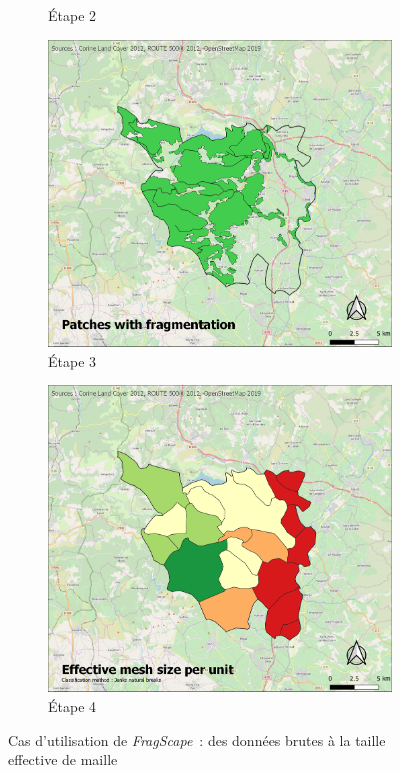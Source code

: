 \documentclass[11pt]{article}
\newcommand{\tool}{\emph{FragScape}}
\begin{document}
\begin{figure}[h!]
\begin{subfigure}[b]{.48\textwidth}
      \caption{Étape 2}
   \end{subfigure}
   \begin{subfigure}[b]{.48\textwidth}
      \includegraphics[width=\textwidth]{pictures/fragmPatches.png}
      \caption{Étape 3}
   \end{subfigure}
   \begin{subfigure}[b]{.48\textwidth}
      \includegraphics[width=\textwidth]{pictures/results.png}
      \caption{Étape 4}
   \end{subfigure}
   \caption{Cas d'utilisation de \tool\ : des données brutes à la taille effective de maille}
   \label{fig:usecase}
\end{figure}
\end{document}
